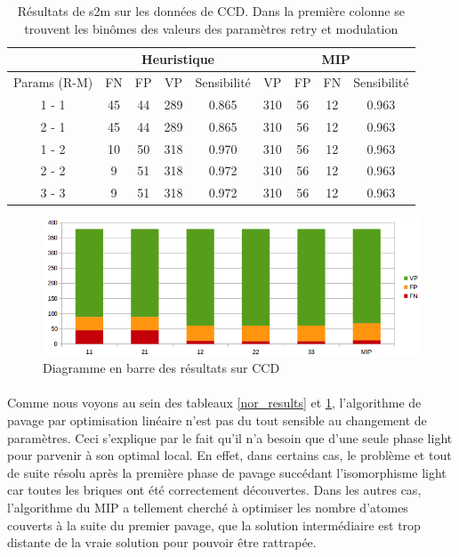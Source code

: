 \documentclass[12pt,french,twoside]{report}
\begin{document}
\begin{table}[!h]
  \centering
  \begin{tabular}{|c|c|c|c|c|c|c|c|c|}
    \hline
    & \multicolumn{4}{c|}{Heuristique} & \multicolumn{4}{c|}{MIP} \\
    \hline
    Params (R-M) & FN & FP & VP & Sensibilité & VP & FP & FN & Sensibilité \\
    \hline
    1 - 1 & 45 & 44 & 289 & 0.865 & 310 & 56 & 12 & 0.963 \\
    \hline
    2 - 1 & 45 & 44 & 289 & 0.865 & 310 & 56 & 12 & 0.963 \\
    \hline
    1 - 2 & 10 & 50 & 318 & 0.970 & 310 & 56 & 12 & 0.963 \\
    \hline
    2 - 2 & 9 & 51 & 318 & 0.972 & 310 & 56 & 12 & 0.963 \\
    \hline
    3 - 3 & 9 & 51 & 318 & 0.972 & 310 & 56 & 12 & 0.963 \\
    \hline
  \end{tabular}
  \caption{\label{ccd_results}Résultats de s2m sur les données de CCD.
  Dans la première colonne se trouvent les binômes des valeurs des paramètres retry et modulation}
\end{table}

\begin{figure}[!h]
  \begin{center}
    \includegraphics[width=450px]{Figures/s2m/results/CCD.png}
    \caption{\label{nor_graph}Diagramme en barre des résultats sur CCD}
  \end{center}
\end{figure}


\paragraph{}Comme nous voyons au sein des tableaux \ref{nor_results} et \ref{ccd_results}, l'algorithme de pavage par optimisation linéaire n'est pas du tout sensible au changement de paramètres.
Ceci s'explique par le fait qu'il n'a besoin que d'une seule phase light pour parvenir à son optimal local.
En effet, dans certains cas, le problème et tout de suite résolu après la première phase de pavage succédant l'isomorphisme light car toutes les briques ont été correctement découvertes.
Dans les autres cas, l'algorithme du MIP a tellement cherché à optimiser les nombre d'atomes couverts à la suite du premier pavage, que la solution intermédiaire est trop distante de la vraie solution pour pouvoir être rattrapée.
\end{document}
